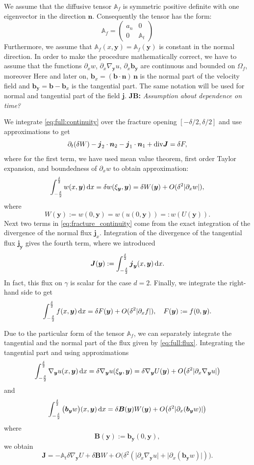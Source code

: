 \documentclass[a4paper]{article}
\def\prtl{\partial}
\def\vc#1{\mathbf{\boldsymbol{#1}}}     %
\def\tn#1{{\mathbb{#1}}}    %
\def\abs#1{\lvert#1\rvert}
\def\div{{\rm div}}
\def\grad{\nabla}
\def\d {\,{\rm d}}
\newcommand{\note}[2]{{\color{blue} \textbf{ #1:} \textit{#2}}}
\begin{document}
We assume that the diffusive tensor $\tn A_f$ is symmetric positive definite 
with one eigenvector in the direction $\vc n$. Consequently the tensor has the form:
\[
 \tn A_f = \begin{pmatrix} 
            a_n & 0  \\
            0 & \tn A_t
       \end{pmatrix}
\]
Furthermore, we assume that $\tn A_f(x, \vc y)=\tn A_f(\vc y)$ is constant in the normal direction.
In order to make the procedure mathematically correct, we have to assume that the functions
$\prtl_x w$, $\prtl_x \grad_{\vc y} u$, $\prtl_x \vc b_{\vc y}$ are continuous and bounded on $\Omega_f$, moreover
Here and later on, 
$\vc b_x=(\vc b \cdot \vc n)\, \vc n$ is the normal part of the velocity field and $\vc b_{\vc y} = \vc b - \vc b_x$ is the tangential part.
The same notation will be used for normal and tangential part of the field $\vc j$.
\note{JB}{Assumption about dependence on time?}

We integrate \eqref{eq:full:continuity} over the fracture opening $[-\delta/2,\delta/2]$ and use approximations to get
\begin{equation}
    \label{eq:fracture_continuity}
   \prtl_t (\delta W) - \vc j_2 \cdot \vc n_2 - \vc j_1 \cdot \vc n_1 + \div \vc J = \delta F,
\end{equation}
where for the first term, we have used mean value theorem, first order Taylor expansion, 
and boundedness of $\prtl_x w$ to obtain approximation:
\[
    \int_{-\frac\delta2}^{\frac\delta2} w(x,\vc y) \d x=\delta w(\xi_{\vc y}, \vc y) = \delta W(\vc y) + O(\delta^2\abs{\prtl_x w}),
\]
where
\[
    W(\vc y):=w(0,\vc y)=w(u(0,\vc y))=:w(U(\vc y)).
\]
Next two terms in \eqref{eq:fracture_continuity} come from the exact integration 
of the divergence of the normal flux $\vc j_x$.
Integration of the divergence of the tangential flux $\vc j_{\vc y}$ gives the fourth term, where we introduced
\[
\vc J(\vc y) := \int_{-\frac\delta2}^{\frac\delta2} \vc j_{\vc y}(x, \vc y) \d x.
\]
In fact, this flux on $\gamma$ is scalar for the case $d=2$. Finally, we integrate the right-hand side to get 
\[
    \int_{-\frac\delta2}^{\frac\delta2} f(x,\vc y) \d x = \delta F(\vc y) + O(\delta^2\abs{\prtl_x f}),\quad F(\vc y):=f(0,\vc y). 
\]


Due to the particular form of the tensor $\tn A_f$, we can separately integrate the tangential and the normal
part of the flux given by \eqref{eq:full:flux}. Integrating the tangential part and using approximations
\[
    \int_{-\frac\delta2}^{\frac\delta2}  \grad_{\vc y} u(x, \vc y) \d x = \delta \grad_{\vc y} u (\xi_{\vc y}, \vc y) 
    = \delta \grad_{\vc y} U( \vc y) + O\big( \delta^2 \abs{\prtl_x\grad_{\vc y} u} \big) 
\]
and
\[
 \int_{-\frac\delta2}^{\frac\delta2} \big(\vc b_{\vc y} w\big)(x, \vc y) \d x 
  = \delta \vc B(\vc y) W(\vc y) + O\big(\delta^2 \abs{\prtl_x(\vc b_{\vc y} w)} \big)
\]
where
\[
  \vc B(\vc y) := \vc b_{\vc y}(0, \vc y),
\]
we obtain
\begin{equation}
    \label{eq:fracture_darcy}
   \vc J = -\tn A_t \delta \grad_{\vc y} U + \delta \vc B W + O\big(\delta^2(\abs{\prtl_x\grad_{\vc y} u}+\abs{\prtl_x(\vc b_{\vc y} w)})\big).
\end{equation}
\end{document}
